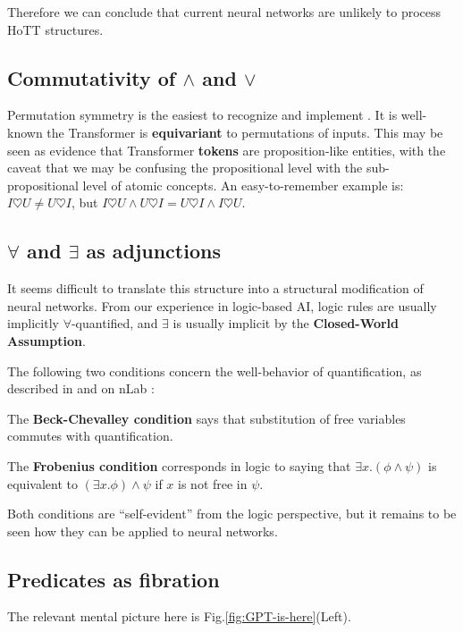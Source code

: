 \documentclass[runningheads]{llncs}
\begin{document}
Therefore we can conclude that current neural networks are unlikely to process HoTT structures.

\subsection{Commutativity of $\wedge$ and $\vee$}

Permutation symmetry is the easiest to recognize and implement \cite{Zaheer2017} \cite{Qi2017}.  It is well-known the Transformer is \textbf{equivariant} to permutations of inputs.  This may be seen as evidence that Transformer \textbf{tokens} are proposition-like entities, with the caveat that we may be confusing the propositional level with the sub-propositional level of atomic concepts.  An easy-to-remember example is: $I \heartsuit U \neq U \heartsuit I$, but $I \heartsuit U \wedge U \heartsuit I = U \heartsuit I \wedge I \heartsuit U$.

\subsection{$\forall$ and $\exists$ as adjunctions}

It seems difficult to translate this structure into a structural modification of neural networks.  From our experience in logic-based AI, logic rules are usually implicitly $\forall$-quantified, and $\exists$ is usually implicit by the \textbf{Closed-World Assumption}.

The following two conditions concern the well-behavior of quantification, as described in \cite{Jacobs1999} and on nLab \cite{nLab-beck-chevalley} \cite{nLab-Frobenius}:

\noindent The \textbf{Beck-Chevalley condition} says that substitution of free variables commutes with quantification.

\noindent The \textbf{Frobenius condition} corresponds in logic to saying that $\exists x. (\phi \wedge \psi)$ is equivalent to $(\exists x. \phi) \wedge \psi$ if $x$ is not free in $\psi$.

Both conditions are ``self-evident'' from the logic perspective, but it remains to be seen how they can be applied to neural networks.

\subsection{Predicates as fibration}

The relevant mental picture here is Fig.\ref{fig:GPT-is-here}(Left). 
\end{document}
